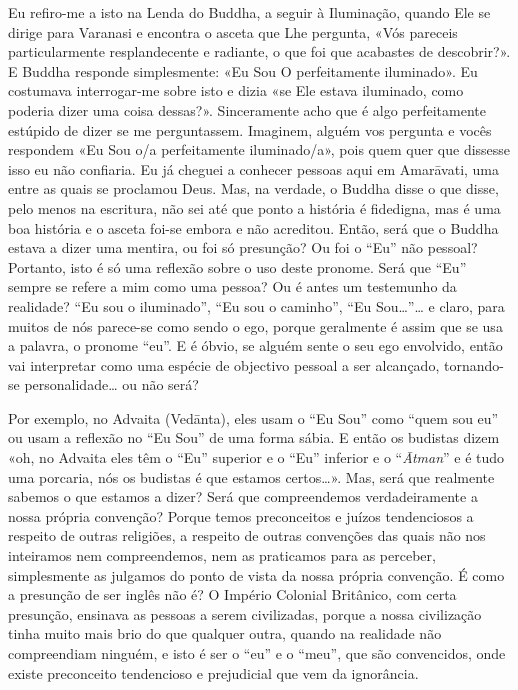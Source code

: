 Eu refiro-me a isto na Lenda do Buddha, a seguir à Iluminação, quando
Ele se dirige para Varanasi e encontra o asceta que Lhe pergunta, «Vós
pareceis particularmente resplandecente e radiante, o que foi que
acabastes de descobrir?». E Buddha responde simplesmente: «Eu Sou O
perfeitamente iluminado». Eu costumava interrogar-me sobre isto e dizia
«se Ele estava iluminado, como poderia dizer uma coisa dessas?».
Sinceramente acho que é algo perfeitamente estúpido de dizer se me
perguntassem. Imaginem, alguém vos pergunta e vocês respondem «Eu Sou
o/a perfeitamente iluminado/a», pois quem quer que dissesse isso eu não
confiaria. Eu já cheguei a conhecer pessoas aqui em Amarāvati, uma entre
as quais se proclamou Deus. Mas, na verdade, o Buddha disse o que disse,
pelo menos na escritura, não sei até que ponto a história é fidedigna,
mas é uma boa história e o asceta foi-se embora e não acreditou. Então,
será que o Buddha estava a dizer uma mentira, ou foi só presunção? Ou
foi o ``Eu'' não pessoal? Portanto, isto é só uma reflexão sobre o uso
deste pronome. Será que ``Eu'' sempre se refere a mim como uma pessoa?
Ou é antes um testemunho da realidade? ``Eu sou o iluminado'', ``Eu sou
o caminho'', ``Eu Sou\ldots{}''\ldots{} e claro, para muitos de nós parece-se como
sendo o ego, porque geralmente é assim que se usa a palavra, o pronome
``eu''. E é óbvio, se alguém sente o seu ego envolvido, então vai
interpretar como uma espécie de objectivo pessoal a ser alcançado,
tornando-se personalidade\ldots{} ou não será?

Por exemplo, no Advaita (Vedānta), eles usam o ``Eu Sou'' como ``quem
sou eu'' ou usam a reflexão no ``Eu Sou'' de uma forma sábia. E então os
budistas dizem «oh, no Advaita eles têm o ``Eu'' superior e o ``Eu''
inferior e o ``\emph{Ātman}'' e é tudo uma porcaria, nós os budistas é
que estamos certos\ldots{}». Mas, será que realmente sabemos o que estamos a
dizer? Será que compreendemos verdadeiramente a nossa própria convenção?
Porque temos preconceitos e juízos tendenciosos a respeito de outras
religiões, a respeito de outras convenções das quais não nos inteiramos
nem compreendemos, nem as praticamos para as perceber, simplesmente as
julgamos do ponto de vista da nossa própria convenção. É como a
presunção de ser inglês não é? O Império Colonial Britânico, com certa
presunção, ensinava as pessoas a serem civilizadas, porque a nossa
civilização tinha muito mais brio do que qualquer outra, quando na
realidade não compreendiam ninguém, e isto é ser o ``eu'' e o ``meu'',
que são convencidos, onde existe preconceito tendencioso e prejudicial
que vem da ignorância.


